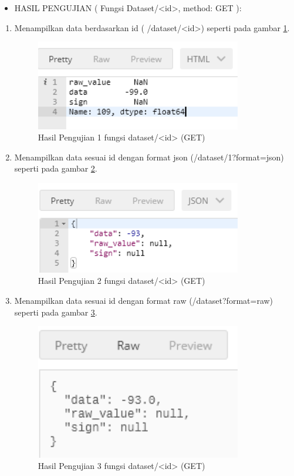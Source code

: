 \begin{itemize}
\item HASIL PENGUJIAN ( Fungsi Dataset/<id>, method: GET ):
\end{itemize}
\begin{enumerate}
\item Menampilkan data berdasarkan id ( /dataset/<id>) seperti pada gambar \ref{fig:hujifdi1}.
\begin{figure}[!htbp]
	\centerline{\includegraphics[width=0.85\textwidth]{figures/10/hujifdi1.PNG}}
	\caption{Hasil Pengujian 1 fungsi dataset/<id> (GET)}
	\label{fig:hujifdi1}
\end{figure}

\item Menampilkan data sesuai id dengan format json (/dataset/1?format=json) seperti pada gambar \ref{fig:hujifdi2}.
\begin{figure}[!htbp]
	\centerline{\includegraphics[width=0.85\textwidth]{figures/10/hujifdi2.PNG}}
	\caption{Hasil Pengujian 2 fungsi dataset/<id> (GET)}
	\label{fig:hujifdi2}
\end{figure}

\item Menampilkan data sesuai id dengan format raw (/dataset?format=raw) seperti pada gambar \ref{fig:hujifdi3}.
\begin{figure}[!htbp]
	\centerline{\includegraphics[width=0.85\textwidth]{figures/10/hujifdi3.PNG}}
	\caption{Hasil Pengujian 3 fungsi dataset/<id> (GET)}
	\label{fig:hujifdi3}
\end{figure}


\end{enumerate}
